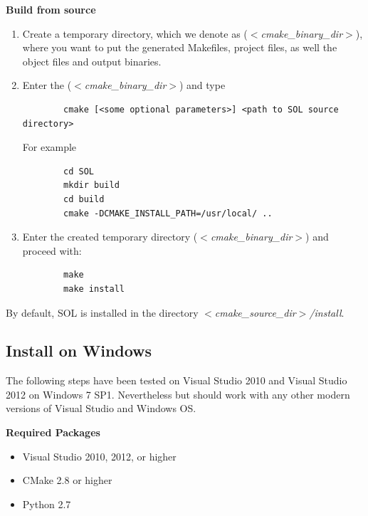 \documentclass[11pt,a4paper]{article}
\newlength{\wideitemsep}
\let\olditem\item
\renewcommand{\item}{\setlength{\itemsep}{\wideitemsep}\olditem}
\begin{document}
\hspace{-5mm}\textbf{Build from source}
\begin{enumerate}
    \item Create a temporary directory, which we denote as
        ($<$\emph{cmake\_binary\_dir}$>$), where you want to put the generated
        Makefiles, project files, as well the object files and output binaries.
    \item Enter the ($<$\emph{cmake\_binary\_dir}$>$) and type 
        \lstset{language=bash,
            framexleftmargin=-1.5cm,
        }
        \begin{lstlisting}
        cmake [<some optional parameters>] <path to SOL source directory>
        \end{lstlisting}

        For example
        \lstset{language=bash,
        }
        \begin{lstlisting}
        cd SOL
        mkdir build
        cd build
        cmake -DCMAKE_INSTALL_PATH=/usr/local/ ..
        \end{lstlisting}

    \item Enter the created temporary directory ($<$\emph{cmake\_binary\_dir}$>$) and proceed with: 
        \lstset{language=bash}
        \begin{lstlisting}
        make 
        make install
        \end{lstlisting}
\end{enumerate}

By default, SOL is installed in the directory \emph{$<$cmake\_source\_dir$>$/install}.


\subsection{Install on Windows}
The following steps have been tested on Visual Studio 2010 and Visual Studio
2012 on Windows 7 SP1. Nevertheless but should work with any other modern
versions of Visual Studio and Windows OS.

\vspace{2mm}\hspace{-5mm}\textbf{Required Packages}
\begin{itemize}
    \item Visual Studio 2010, 2012, or higher
    \item CMake 2.8 or higher
    \item Python 2.7 
\end{itemize}
\end{document}
